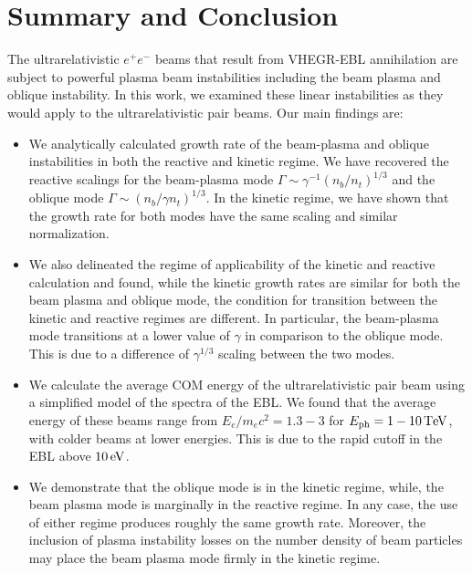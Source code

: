 \documentclass[usenatbib,iop,apj,numberedappendix]{aeb_emulateapj_2015}
\def\eV{{\rm eV}} %
\def\TeV{{\rm T}\eV} %
\newcommand{\epm}{\ensuremath{e^+e^-}}
\begin{document}
\section{Summary and Conclusion}\label{sec:conclusions}

The ultrarelativistic $\epm$ beams that result from VHEGR-EBL annihilation are subject to powerful plasma beam instabilities including the beam plasma and oblique instability.  In this work, we examined these linear instabilities as they would apply to the ultrarelativistic pair beams.  Our main findings are:
\begin{itemize}
\item{We analytically calculated growth rate of the beam-plasma and oblique instabilities in both the reactive and kinetic regime.  We have recovered the reactive scalings for the beam-plasma mode $\Gamma \sim \gamma^{-1}(n_b/n_t)^{1/3}$ and the oblique mode $\Gamma \sim (n_b/\gamma n_t)^{1/3}$.  In the kinetic regime, we have shown that the growth rate for both modes have the same scaling and similar normalization.}
\item{We also delineated the regime of applicability of the kinetic and reactive calculation and found, while the kinetic growth rates are similar for both the beam plasma and oblique mode, the condition for transition between the kinetic and reactive regimes are different.  In particular, the beam-plasma mode transitions at a lower value of $\gamma$ in comparison to the oblique mode.  This is due to a difference of $\gamma^{1/3}$ scaling between the two modes.}
\item{We calculate the average COM energy of the ultrarelativistic pair beam using a simplified model of the spectra of the EBL.  We found that the average energy of these beams range from $E_e/m_e c^2 = 1.3-3$ for $E_{\rm ph} = 1-10\,\TeV$, with colder beams at lower energies.  This is due to the rapid cutoff in the EBL above $10\,\eV$. }
\item{We demonstrate that the oblique mode is in the kinetic regime, while, the beam plasma mode is marginally in the reactive regime. In any case, the use of either regime produces roughly the same growth rate.  Moreover, the inclusion of plasma instability losses on the number density of beam particles may place the beam plasma mode firmly in the kinetic regime.}
\end{itemize}
\end{document}
